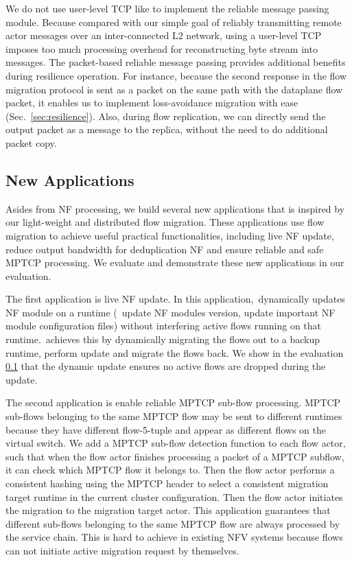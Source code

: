 We do not use user-level TCP like \cite{mtcp} to implement the reliable message passing module. Because compared with our simple goal of reliably transmitting remote actor messages over an inter-connected L2 network, using a user-level TCP imposes too much processing overhead for reconstructing byte stream into messages. The packet-based reliable message passing provides additional benefits during resilience operation. For instance, because the second response in the flow migration protocol is sent as a packet on the same path with the dataplane flow packet, it enables us to implement loss-avoidance migration with ease (Sec.~\ref{sec:resilience}). Also, during flow replication, we can directly send the output packet as a message to the replica, without the need to do additional packet copy.

\subsection{New Applications}

Asides from NF processing, we build several new applications that is inspired by our light-weight and distributed flow migration. These applications use flow migration to achieve useful practical functionalities, including live NF update, reduce output bandwidth for deduplication NF and ensure reliable and safe MPTCP processing. We evaluate and demonstrate these new applications in our evaluation.

The first application is live NF update. In this application,~\nfactor dynamically updates NF module on a runtime (\ie~update NF modules version, update important NF module configuration files) without interfering active flows running on that runtime.~\nfactor achieves this by dynamically migrating the flows out to a backup runtime, perform update and migrate the flows back. We show in the evaluation \ref{} that the dynamic update ensures no active flows are dropped during the update.

The second application is enable reliable MPTCP \cite{} sub-flow processing. MPTCP sub-flows belonging to the same MPTCP flow may be sent to different runtimes because they have different flow-5-tuple and appear as different flows on the virtual switch. We add a MPTCP sub-flow detection function to each flow actor, such that when the flow actor finishes processing a packet of a MPTCP subflow, it can check which MPTCP flow it belongs to. Then the flow actor performs a consistent hashing using the MPTCP header to select a consistent migration target runtime in the current cluster configuration. Then the flow actor initiates the migration to the migration target actor. This application guarantees that different sub-flows belonging to the same MPTCP flow are always processed by the service chain. This is hard to achieve in existing NFV systems because flows can not initiate active migration request by themselves.


